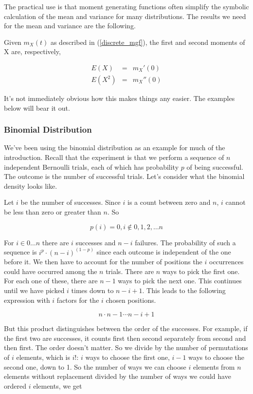 \documentclass[]{article}
\begin{document}
The practical use is that moment generating functions
often simplify the symbolic calculation of the mean and
variance for many distributions.  The results we need
for the mean and variance are the following.

Given $m_X(t)$ as described in (\ref{discrete_mgf}), the
first and second moments of X are, respectively,

\begin{eqnarray}
E(X) & = & m_X'(0) \label{discrete_mgt_d1} \\
E(X^2) & = & m_X''(0) \label{discrete_mgt_d2}
\end{eqnarray}

It's not immediately obvious how this makes things any
easier.  The examples below will bear it out.

\subsubsection{Binomial Distribution}

We've been using the binomial distribution as an example
for much of the introduction.  Recall that the experiment is that
we perform a sequence of $n$ independent Bernoulli trials, each
of which has probability $p$ of being successful.  The outcome is
the number of successful trials.  Let's consider what the
binomial density looks like.

Let $i$ be the number of successes.  Since $i$ is a count between
zero and $n$, $i$ cannot be less than zero or greater than $n$.  So

$$
p(i) = 0, i \not\in 0, 1, 2, \ldots n
$$

For $i \in 0 \ldots n$ there are $i$ successes and $n-i$ failures.
The probability of such a sequence is $i^p \cdot (n-i)^{(1-p)}$
since each outcome is independent of the one before it.  We then
have to account for the number of positions the $i$ occurrences
could have occurred among the $n$ trials.  There are $n$ ways to
pick the first one.  For each one of these, there are $n-1$ ways
to pick the next one.  This continues until we have picked $i$
times down to $n-i+1$.  This leads to the following expression
with $i$ factors for the $i$ chosen positions.

$$
n \cdot n-1 \cdots n-i+1
$$

But this product distinguishes between the order of the successes.
For example, if the first two are successes, it counts first then
second separately from second and then first.  The order doesn't
matter.  So we divide by the number of permutations of $i$ elements,
which is $i!$: $i$ ways to choose the first one, $i-1$ ways to
choose the second one, down to 1.  So the number of ways we
can choose $i$ elements from $n$ elements without replacement
divided by the number of ways we could have ordered $i$ elements,
we get 
\end{document}
